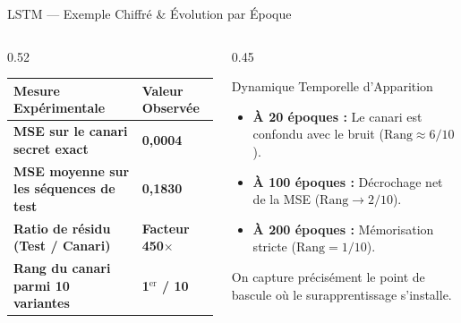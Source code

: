 \documentclass[aspectratio=169, 10pt, table]{beamer}
\begin{document}
\begin{frame}{LSTM --- Exemple Chiffré \& Évolution par Époque}
    \begin{columns}[c]
        \begin{column}{0.52\textwidth}
            \renewcommand{\arraystretch}{1.25}
            \small
            \begin{tabularx}{\textwidth}{>{\bfseries}l >{\centering\arraybackslash}X}
                \toprule
                \rowcolor{TSPblue}\color{white}\textbf{Mesure Expérimentale} & \color{white}\textbf{Valeur Observée} \\
                \midrule
                MSE sur le canari secret exact & \textbf{0{,}0004} \\
                MSE moyenne sur les séquences de test & \textbf{0{,}1830} \\
                Ratio de résidu (Test / Canari) & \textbf{Facteur 450$\times$} \\
                \midrule
                Rang du canari parmi 10 variantes & \textbf{\color{TSPblue}1$^{\text{er}}$ / 10} \\
                \bottomrule
            \end{tabularx}
        \end{column}

        \begin{column}{0.45\textwidth}
            \begin{alertblock}{Dynamique Temporelle d'Apparition}
                \small
                \begin{itemize}
                    \item \textbf{À 20 époques :} Le canari est confondu avec le bruit ($\text{Rang} \approx 6/10$).
                    \item \textbf{À 100 époques :} Décrochage net de la MSE ($\text{Rang} \to 2/10$).
                    \item \textbf{À 200 époques :} Mémorisation stricte ($\text{Rang} = 1/10$).
                \end{itemize}
                On capture précisément le point de bascule où le surapprentissage s'installe.
            \end{alertblock}
        \end{column}
    \end{columns}
\end{frame}

\end{document}
